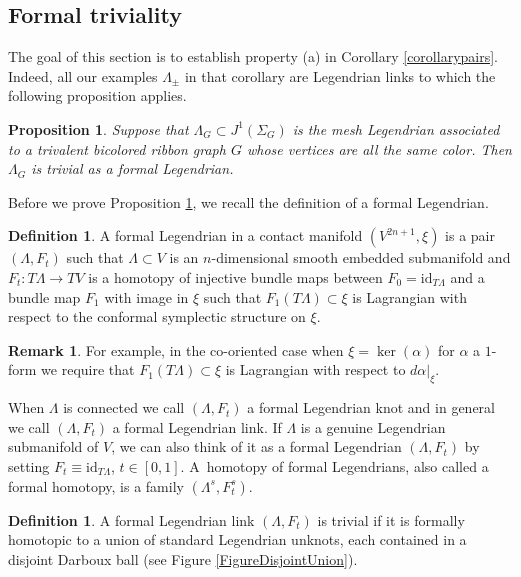 \documentclass[11pt]{article}
\numberwithin{equation}{section}\providecommand{\dpl}{\displaystyle}
\newcommand{\id}{\mathrm{id}}
\theoremstyle{plain}
\newtheorem{proposition}[theorem]{Proposition}
\theoremstyle{definition}
\newtheorem{definition}[theorem]{Definition}
\newtheorem{remark}[theorem]{Remark}
\begin{document}
\subsection{Formal triviality}\label{formal triviality}
The goal of this section is to establish property (a) in Corollary \ref{corollarypairs}. Indeed, all our examples $\Lambda_{\pm}$ in that corollary are Legendrian links to which the following proposition applies.

\begin{proposition}\label{unlinked} Suppose that $\Lambda_G \subset J^1(\Sigma_G)$ is the mesh Legendrian associated to a trivalent bicolored ribbon graph $G$ whose vertices are all the same color. Then $\Lambda_G$ is trivial as a formal Legendrian.
\end{proposition}

Before we prove Proposition \ref{unlinked}, we recall the definition of a formal Legendrian.

\begin{definition}
A formal Legendrian in a contact manifold $(V^{2n+1},\xi)$ is a pair $(\Lambda, F_t)$ such that $\Lambda \subset V$ is an $n$-dimensional smooth embedded submanifold and $F_t: T \Lambda \to TV$ is a homotopy of injective bundle maps between $F_0=\id_{T\Lambda}$ and a bundle map $F_1$ with image in $\xi$ such that $F_1(T\Lambda) \subset \xi$ is Lagrangian with respect to the conformal symplectic structure on $\xi$.
\end{definition}

\begin{remark}
For example, in the co-oriented case when $\xi= \ker(\alpha)$ for $\alpha$ a $1$-form we require that $F_1(T\Lambda) \subset \xi$ is Lagrangian with respect to $d \alpha |_\xi$.
\end{remark}

When $\Lambda$ is connected we call $(\Lambda, F_t)$ a formal Legendrian knot and in general we call $(\Lambda, F_t)$ a formal Legendrian link. If $\Lambda$ is a genuine Legendrian submanifold of $V$, we can also think of it as a formal Legendrian $(\Lambda, F_t)$ by setting $F_t \equiv \id_{T\Lambda}$, $t \in [0,1]$. A~homotopy of formal Legendrians, also called a formal homotopy, is a family $(\Lambda^s,F_t^s)$.

\begin{definition}
A formal Legendrian link $(\Lambda, F_t)$ is trivial if it is formally homotopic to a union of standard Legendrian unknots, each contained in a disjoint Darboux ball (see Figure \ref{FigureDisjointUnion}).
\end{definition}
\end{document}
